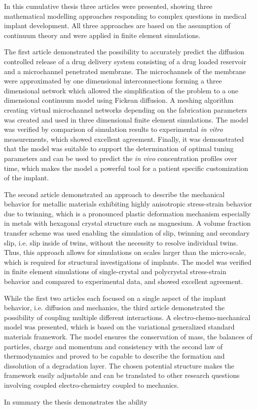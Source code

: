 In this cumulative thesis three articles were presented, showing three mathematical modelling approaches responding to complex questions in medical implant development. All three approaches are based on the assumption of continuum theory and were applied in finite element simulations. 

The first article demonstrated the possibility to accurately predict the diffusion controlled release of a drug delivery system consisting of a drug loaded reservoir and a microchannel penetrated membrane. The microchannels of the membrane were approximated by one dimensional interconnections forming a three dimensional network which allowed the simplification of the problem to a one dimensional continuum model using Fickean diffusion. A meshing algorithm creating virtual microchannel networks depending on the fabrication parameters was created and used in three dimensional finite element simulations. The model was verified by comparison of simulation results to experimental \textit{in vitro} measurements, which showed excellent agreement. Finally, it was demonstrated that the model was suitable to support the determination of optimal tuning parameters and can be used to predict the \textit{in vivo} concentration profiles over time, which makes the model a powerful tool for a patient specific customization of the implant.

The second article demonstrated an approach to describe the mechanical behavior for metallic materials exhibiting highly anisotropic stress-strain behavior due to twinning, which is a pronounced plastic deformation mechanism especially in metals with hexagonal crystal structure such as magnesium. A volume fraction transfer scheme was used enabling the simulation of slip, twinning and secondary slip, i.e. slip inside of twins, without the necessity to resolve individual twins. Thus, this approach allows for simulations on scales larger than the micro-scale, which is required for structural investigations of implants. The model was verified in finite element simulations of single-crystal and polycrystal stress-strain behavior and compared to experimental data, and showed excellent agreement.  

While the first two articles each focused on a single aspect of the implant behavior, i.e. diffusion and mechanics, the third article demonstrated the possibility of coupling multiple different interactions. A electro-chemo-mechanical model was presented, which is based on the variational generalized standard materials framework. The model ensures the conservation of mass, the balances of particles, charge and momentum and consistency with the second law of thermodynamics and proved to be capable to describe the formation and dissolution of a degradation layer. The chosen potential structure makes the framework easily adjustable and can be translated to other research questions involving coupled electro-chemistry coupled to mechanics. 

In summary the thesis demonstrates the ability 